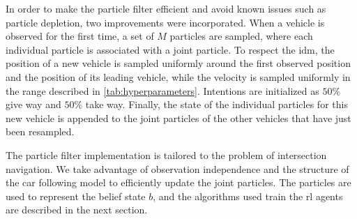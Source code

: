 In order to make the particle filter efficient and avoid known issues such as particle depletion, two improvements were incorporated. 
When a vehicle is observed for the first time, a set of $M$ particles are sampled, where each individual particle is associated with a joint particle. To respect the \gls{idm}, the position of a new vehicle is sampled uniformly around the first observed position and the position of its leading vehicle, while the velocity is sampled uniformly in the range described in \ref{tab:hyperparameters}. 
Intentions are initialized as $50\%$ give way and $50\%$ take way. Finally, the state of the individual particles for this new vehicle is appended to the joint particles of the other vehicles that have just been resampled. 


The particle filter implementation is tailored to the problem of intersection navigation. We take advantage of observation independence and the structure of the car following model to efficiently update the joint particles. The particles are used to represent the belief state $b$, and the algorithms used train the \gls{rl} agents are described in the next section. 


